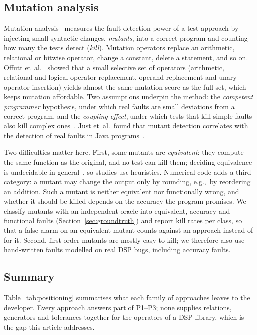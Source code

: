 \documentclass[10pt,conference]{IEEEtran}
\newcommand{\eg}{e.g.,\ }
\begin{document}
\subsection{Mutation analysis}
Mutation analysis~\cite{jia2011mutation,papadakis2019mutation} measures the
fault-detection power of a test approach by injecting small syntactic changes,
\emph{mutants}, into a correct program and counting how many the tests detect
(\emph{kill}). Mutation operators replace an arithmetic, relational or bitwise
operator, change a constant, delete a statement, and so on. Offutt
et~al.~\cite{offutt1996mutation} showed that a small selective set of operators
(arithmetic, relational and logical operator replacement, operand replacement
and unary operator insertion) yields almost the same mutation score as the full
set, which keeps mutation affordable. Two
assumptions underpin the method: the \emph{competent programmer} hypothesis,
under which real faults are small deviations from a correct program, and the
\emph{coupling effect}, under which tests that kill simple faults also kill
complex ones~\cite{jia2011mutation}. Just et~al.\ found that mutant detection
correlates with the detection of real faults in Java
programs~\cite{just2014mutants}.

Two difficulties matter here. First, some mutants are \emph{equivalent}: they
compute the same function as the original, and no test can kill them; deciding
equivalence is undecidable in general~\cite{jia2011mutation}, so studies use
heuristics. Numerical code adds a third category: a mutant may change the
output only by rounding, \eg by reordering an addition. Such a mutant is
neither equivalent nor functionally wrong, and whether it should be killed
depends on the accuracy the program promises. We classify mutants with an
independent oracle into equivalent, accuracy and functional faults
(Section~\ref{sec:groundtruth}) and report kill rates per class, so that a
false alarm on an equivalent mutant counts against an approach instead of for
it. Second, first-order mutants are mostly easy to kill; we therefore also use
hand-written faults modelled on real DSP bugs, including accuracy faults.

\subsection{Summary}
Table~\ref{tab:positioning} summarises what each family of approaches leaves to
the developer. Every approach answers part of P1--P3; none supplies relations,
generators and tolerances together for the operators of a DSP library, which is
the gap this article addresses.
\end{document}
